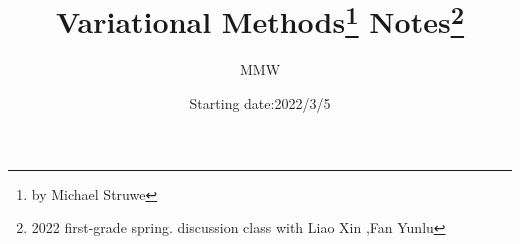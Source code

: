 \usepackage{hyperref}
\usepackage{amsmath}
\usepackage{amsfonts}
\usepackage{amsthm}
\usepackage{physics}
\usepackage{amssymb}
\usepackage{color,xcolor}


\hypersetup{
colorlinks=true,
linkcolor=black
}

\newtheorem*{theorem*}{Theorem}

\newtheorem*{lemma*}{Lemma}

{
\theoremstyle{remark}
\newtheorem*{remark*}{\bfseries Remark}
}


\newcommand{\question}[0]{\noindent\textcolor{red}{\large\bfseries Question:\vspace{1ex}}}

\newcommand{\answer}[1]{\noindent\textcolor{cyan}{\large\bfseries Answer:}{ \,\,#1}\hfill \mbox{}  \hfill $\blacksquare$}

\newcommand{\solution}[0]{\noindent\textcolor{cyan}{\large\bfseries Solution:}}

\newcommand{\myend}[0]{\hfill \mbox{}\hfill $\blacksquare$}

\author{MMW}
\date{Starting date:2022/3/5}
\title{Variational Methods\footnote{by Michael Struwe}  Notes\footnote{2022 first-grade spring. discussion class with Liao Xin ,Fan Yunlu}}

\endinput